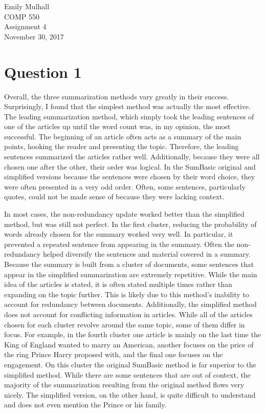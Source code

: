 \documentclass{article}
\begin{document}
\noindent Emily Mulhall\\
COMP 550\\
Assignment 4\\
November 30, 2017\\
\section*{Question 1}
Overall, the three summarization methods vary greatly in their success.  Surprisingly, I found that the simplest method was actually the most effective.  The leading summarization method, which simply took the leading sentences of one of the articles up until the word count was, in my opinion, the most successful.  The beginning of an article often acts as a summary of the main points, hooking the reader and presenting the topic.  Therefore, the leading sentences summarized the articles rather well.  Additionally, because they were all chosen one after the other, their order was logical.  In the SumBasic original and simplified versions because the sentences were chosen by their word choice, they were often presented in a very odd order.  Often, some sentences, particularly quotes, could not be made sense of because they were lacking context.

In most cases, the non-redundancy update worked better than the simplified method, but was still not perfect.  In the first cluster, reducing the probability of words already chosen for the summary worked very well.  In particular, it prevented a repeated sentence from appearing in the summary.  Often the non-redundancy helped diversify the sentences and material covered in a summary.  Because the summary is built from a cluster of documents, some sentences that appear in the simplified summarization are extremely repetitive.  While the main idea of the articles is stated, it is often stated multiple times rather than expanding on the topic further.  This is likely due to this method's inability to account for redundancy between documents.  Additionally, the simplified method does not account for conflicting information in articles.  While all of the articles chosen for each cluster revolve around the same topic, some of them differ in focus.  For example, in the fourth cluster one article is mainly on the last time the King of England wanted to marry an American, another focuses on the price of the ring Prince Harry proposed with, and the final one focuses on the engagement.  On this cluster the original SumBasic method is far superior to the simplified method.  While there are some sentences that are out of context, the majority of the summarization resulting from the original method flows very nicely.  The simplified version, on the other hand, is quite difficult to understand and does not even mention the Prince or his family.
\end{document}
